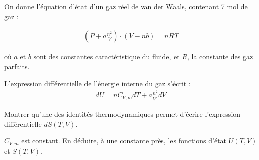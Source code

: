 \begin{exercise}
On donne l’équation d’état d’un gaz réel de van der Waals, contenant 7 mol de gaz :

\begin{align*}
\left( P+ a \frac{n^2}{V} \right) \cdot (V-nb) = nRT
\end{align*}

où $a$ et $b$ sont des constantes caractéristique du fluide, et $R$, la constante des gaz parfaits. 

L'expression différentielle de l’énergie interne du gaz s’écrit :
\begin{align*}
d U = n C_{V,m} dT + a \frac{n^2}{V^2} dV
\end{align*}

\begin{questions}
\question Montrer qu’une des identités thermodynamiques permet d’écrire l’expression différentielle $dS(T,V)$.

\question $C_{V,m}$ est constant. En déduire, à une constante près, les fonctions d’état $U(T,V)$ et $S(T,V)$.
\end{questions}

\end{exercise}